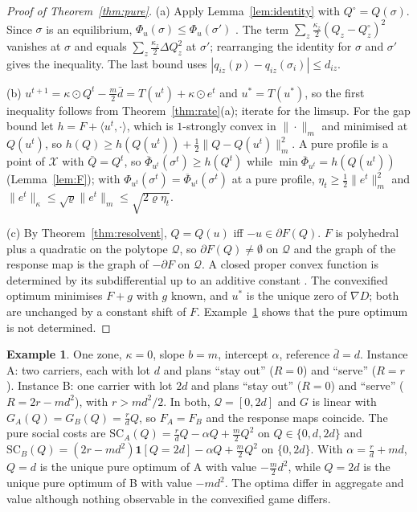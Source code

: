 \documentclass[preprint,11pt]{elsarticle}
\theoremstyle{definition}
\newtheorem{example}[theorem]{Example}
\theoremstyle{remark}
\newcommand{\ip}[2]{\langle #1,#2\rangle}
\newcommand{\cQ}{\mathcal{Q}}
\newcommand{\cX}{\mathcal{X}}
\begin{document}
\begin{proof}[Proof of Theorem~\ref{thm:pure}]
(a) Apply Lemma~\ref{lem:identity} with $Q^\circ=Q(\sigma)$. Since $\sigma$ is an equilibrium, $\Phi_u(\sigma)\le\Phi_u(\sigma')$ \citep{Monderer1996}. The term $\sum_z\tfrac{\kappa_z}{2}(Q_z-Q^\circ_z)^2$ vanishes at $\sigma$ and equals $\sum_z\tfrac{\kappa_z}{2}\Delta Q_z^2$ at $\sigma'$; rearranging the identity for $\sigma$ and $\sigma'$ gives the inequality. The last bound uses $|q_{iz}(p)-q_{iz}(\sigma_i)|\le d_{iz}$.

(b) $u^{t+1}=\kappa\odot Q^t-\tfrac m2\bar d=T(u^t)+\kappa\odot e^t$ and $u^*=T(u^*)$, so the first inequality follows from Theorem~\ref{thm:rate}(a); iterate for the limsup. For the gap bound let $h=F+\ip{u^t}\cdot$, which is $1$-strongly convex in $\|\cdot\|_m$ and minimised at $Q(u^t)$, so $h(Q)\ge h(Q(u^t))+\tfrac12\|Q-Q(u^t)\|_m^2$. A pure profile is a point of $\cX$ with $\bar Q=Q^t$, so $\overline\Phi_{u^t}(\sigma^t)\ge h(Q^t)$ while $\min\overline\Phi_{u^t}=h(Q(u^t))$ (Lemma~\ref{lem:F}); with $\Phi_{u^t}(\sigma^t)=\overline\Phi_{u^t}(\sigma^t)$ at a pure profile, $\eta_t\ge\tfrac12\|e^t\|_m^2$ and $\|e^t\|_\kappa\le\sqrt\varrho\|e^t\|_m\le\sqrt{2\varrho\eta_t}$.

(c) By Theorem~\ref{thm:resolvent}, $Q=Q(u)$ iff $-u\in\partial F(Q)$. $F$ is polyhedral plus a quadratic on the polytope $\cQ$, so $\partial F(Q)\ne\emptyset$ on $\cQ$ and the graph of the response map is the graph of $-\partial F$ on $\cQ$. A closed proper convex function is determined by its subdifferential up to an additive constant \citep[Theorem 24.9]{Rockafellar1970}. The convexified optimum minimises $F+g$ with $g$ known, and $u^*$ is the unique zero of $\nabla D$; both are unchanged by a constant shift of $F$. Example~\ref{ex:ident} shows that the pure optimum is not determined.
\end{proof}

\begin{example}\label{ex:ident}
One zone, $\kappa=0$, slope $b=m$, intercept $\alpha$, reference $\bar d=d$. Instance A: two carriers, each with lot $d$ and plans ``stay out'' ($R=0$) and ``serve'' ($R=r$). Instance B: one carrier with lot $2d$ and plans ``stay out'' ($R=0$) and ``serve'' ($R=2r-md^2$), with $r>md^2/2$. In both, $\cQ=[0,2d]$ and $G$ is linear with $G_A(Q)=G_B(Q)=\tfrac rdQ$, so $F_A=F_B$ and the response maps coincide. The pure social costs are $\mathrm{SC}_A(Q)=\tfrac rdQ-\alpha Q+\tfrac m2Q^2$ on $Q\in\{0,d,2d\}$ and $\mathrm{SC}_B(Q)=(2r-md^2)\mathbf 1[Q=2d]-\alpha Q+\tfrac m2Q^2$ on $\{0,2d\}$. With $\alpha=\tfrac rd+md$, $Q=d$ is the unique pure optimum of A with value $-\tfrac m2d^2$, while $Q=2d$ is the unique pure optimum of B with value $-md^2$. The optima differ in aggregate and value although nothing observable in the convexified game differs.
\end{example}
\end{document}
